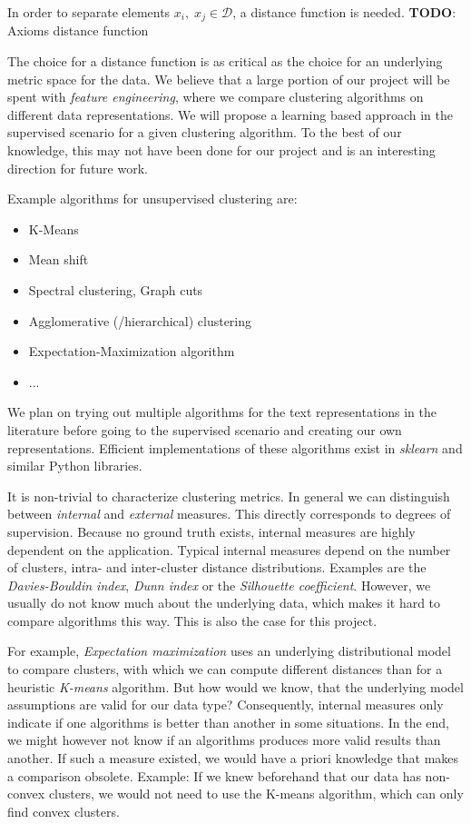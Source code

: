 In order to separate elements $ x_{i},\; x_{j} \in \mathcal{D} $, a distance function is needed. 
\textbf{TODO}: Axioms distance function

The choice for a distance function is as critical as the choice for an underlying metric space for the data. We believe that a large portion of our project will be spent with \textit{feature engineering}, where we compare clustering algorithms on different data representations. We will propose a learning based approach in the supervised scenario for a given clustering algorithm. To the best of our knowledge, this may not have been done for our project and is an interesting direction for future work.

Example algorithms for unsupervised clustering are:
\begin{itemize}
	\item K-Means
	\item Mean shift
	\item Spectral clustering, Graph cuts
	\item Agglomerative (/hierarchical) clustering
	\item Expectation-Maximization algorithm
	\item ...
\end{itemize}
We plan on trying out multiple algorithms for the text representations in the literature before going to the supervised scenario and creating our own representations. Efficient implementations of these algorithms exist in \textit{sklearn} and similar Python libraries. 

It is non-trivial to characterize clustering metrics. In general we can distinguish between \textit{internal} and \textit{external} measures. This directly corresponds to degrees of supervision. Because no ground truth exists, internal measures are highly dependent on the application. Typical internal measures depend on the number of clusters, intra- and inter-cluster distance distributions. Examples are the \textit{Davies-Bouldin index}, \textit{Dunn index} or the \textit{Silhouette coefficient}. However, we usually do not know much about the underlying data, which makes it hard to compare algorithms this way. This is also the case for this project. 

For example, \textit{Expectation maximization} uses an underlying distributional model to compare clusters, with which we can compute different distances than for a heuristic \textit{K-means} algorithm. But how would we know, that the underlying model assumptions are valid for our data type? Consequently, internal measures only indicate if one algorithms is better than another in some situations. In the end, we might however not know if an algorithms produces more valid results than another. If such a measure existed, we would have a priori knowledge that makes a comparison obsolete. Example: If we knew beforehand that our data has non-convex clusters, we would not need to use the K-means algorithm, which can only find convex clusters.

